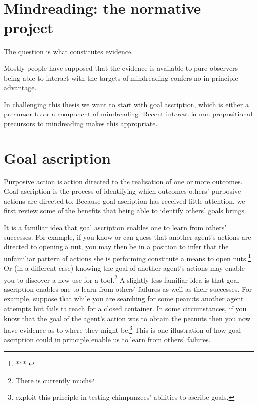 \documentclass[12pt,a4paper]{extarticle}
\begin{document}
\setlength\footnotesep{1em}


\maketitle

\begin{abstract}
***
\end{abstract}


\section{Mindreading: the normative project}

The question is what constitutes evidence.

Mostly people have supposed that the evidence is available to pure observers --- being able to interact with the targets of mindreading confers no in principle advantage.

In challenging this thesis we want to start with goal ascription, which is either a precursor to or a component of mindreading.
Recent interest in non-propositional precursors to mindreading makes this appropriate.


\section{Goal ascription}
Purposive action is action directed to the realisation of one or more outcomes.
Goal ascription is the process of identifying which outcomes others' purposive actions are directed to.
Because goal ascription has received little attention,
we  first review some of the benefits that being able to identify others' goals brings.

It is a familiar idea that goal ascription enables one to learn from others' successes.
For example,
if you know or can guess that another agent's actions are directed to opening a nut,
you may then be in a position to infer that the unfamiliar pattern of actions she is performing constitute a means to open nuts.\footnote{
***
\citep{Horner:2005pj}
}
Or (in a different case) knowing the goal of another agent's actions may enable you to discover a new use for a tool.\footnote{
There is currently much 
}
A slightly less familiar idea is that goal ascription enables one to learn from others' failures as well as their successes.
For example, suppose that while you are searching for some peanuts 
another agent attempts but fails to reach for a closed container.
In some circumstances,
if you know that the goal of the agent's action was to obtain the peanuts
then you now have evidence as to where they might be.\footnote{
\citet{hare_chimpanzees_2004} exploit this principle in testing chimpanzees' abilities to ascribe goals.
}
This is one illustration of how goal ascription could in principle enable us to learn from others' failures.
\end{document}
